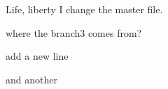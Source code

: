 \documentclass{article}
\begin{document}
Life, liberty
I change the master file.

where the branch3 comes from?

add a new line

and another
\end{document}
